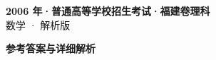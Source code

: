 \documentclass[zihao=-4, a4paper]{ctexart}
\begin{document}
\begin{center}
  {\Large\bfseries 2006 年·普通高等学校招生考试·福建卷理科}\\[4pt]
  {\large 数学 · 解析版}
\end{center}
\medskip
{}

\clearpage
{}
\begin{center}{\Large\bfseries 参考答案与详细解析}\end{center}
\medskip

\end{document}
